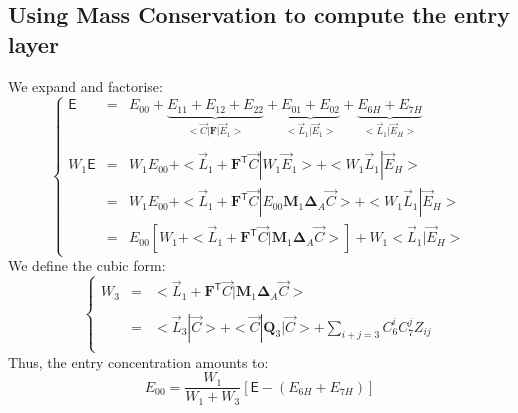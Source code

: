 \documentclass[aps,onecolumn,11pt]{revtex4}
\newcommand{\mytrn}[1]{{#1}^{\!\mathsf{T}}}
\newcommand{\mymat}[1]{{\bm{#1}}}
\begin{document}
\subsection{Using Mass Conservation to compute the entry layer}
We expand and factorise:
\begin{equation}
\left\lbrace
\begin{array}{rcl}
\mathsf{E}    & = & E_{00} 
+ \underbrace{E_{11}+E_{12}+E_{22}}_{<\vec{C}|\mymat{F}|\vec{E}_1>} 
+ \underbrace{E_{01}+E_{02}}_{<\vec{L}_1|\vec{E}_1>} 
+ \underbrace{E_{6H} + E_{7H}}_{<\vec{L}_1|\vec{E}_H>}\\
\\
W_1 \mathsf{E} & = & W_1 E_{00} + < \vec{L}_1 + \mytrn{\mymat{F}}\vec{C} | W_1 \vec{E}_1 > + <W_1 \vec{L}_1|\vec{E}_H> \\
& = & W_1 E_{00} + < \vec{L}_1 + \mytrn{\mymat{F}}\vec{C} | E_{00} \mymat{M}_1  \mymat{\Delta}_A \vec{C} > + <W_1 \vec{L}_1|\vec{E}_H> \\
& = & E_{00} \left[ W_1 + < \vec{L}_1 + \mytrn{\mymat{F}}\vec{C} | \mymat{M}_1  \mymat{\Delta}_A \vec{C} > \right] + W_1 <\vec{L}_1 | \vec{E}_H>
\end{array}
\right.
\end{equation}
We define the cubic form:
\begin{equation}
\left\lbrace
\begin{array}{rcl}
	W_3 & = & < \vec{L}_1 + \mytrn{\mymat{F}}\vec{C} | \mymat{M}_1  \mymat{\Delta}_A \vec{C} >\\
	\\
	& = & \displaystyle <\vec{L}_3|\vec{C}> + <\vec{C}|\mymat{Q}_3|\vec{C}> + \sum_{i+j=3}C_6^i C_7^j Z_{ij}  \\
\end{array}
\right.
\end{equation}
Thus, the entry concentration amounts to:
\begin{equation}
\boxed{
 E_{00}  = \dfrac{W_1}{W_1 + W_3} \left[\mathsf{E}-(E_{6H}+E_{7H})\right]
 }
\end{equation}
\end{document}
